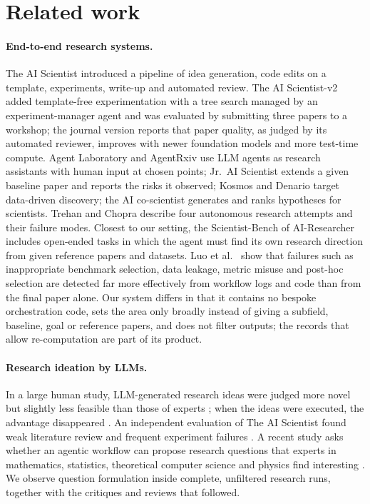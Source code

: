 \documentclass[11pt]{article}
\begin{document}
\section{Related work}
\label{sec:related}

\paragraph{End-to-end research systems.}
The AI Scientist \citep{lu2024aiscientist} introduced a pipeline of idea generation, code edits on a template, experiments, write-up and automated review. The AI Scientist-v2 \citep{yamada2025aiscientistv2} added template-free experimentation with a tree search managed by an experiment-manager agent and was evaluated by submitting three papers to a workshop; the journal version \citep{lu2026nature} reports that paper quality, as judged by its automated reviewer, improves with newer foundation models and more test-time compute. Agent Laboratory \citep{schmidgall2025agentlab} and AgentRxiv \citep{schmidgall2025agentrxiv} use LLM agents as research assistants with human input at chosen points; Jr.\ AI Scientist \citep{miyai2025jraiscientist} extends a given baseline paper and reports the risks it observed; Kosmos \citep{mitchener2025kosmos} and Denario \citep{villaescusa2025denario} target data-driven discovery; the AI co-scientist \citep{gottweis2025coscientist} generates and ranks hypotheses for scientists. Trehan and Chopra \citep{trehan2026whyllms} describe four autonomous research attempts and their failure modes. Closest to our setting, the Scientist-Bench of AI-Researcher \citep{tang2025airesearcher} includes open-ended tasks in which the agent must find its own research direction from given reference papers and datasets. Luo et al.\ \citep{luo2025pitfalls} show that failures such as inappropriate benchmark selection, data leakage, metric misuse and post-hoc selection are detected far more effectively from workflow logs and code than from the final paper alone. Our system differs in that it contains no bespoke orchestration code, sets the area only broadly instead of giving a subfield, baseline, goal or reference papers, and does not filter outputs; the records that allow re-computation are part of its product.

\paragraph{Research ideation by LLMs.}
In a large human study, LLM-generated research ideas were judged more novel but slightly less feasible than those of experts \citep{si2024ideas}; when the ideas were executed, the advantage disappeared \citep{si2025ideationgap}. An independent evaluation of The AI Scientist found weak literature review and frequent experiment failures \citep{beel2025evaluating}. A recent study asks whether an agentic workflow can propose research questions that experts in mathematics, statistics, theoretical computer science and physics find interesting \citep{nie2026after42}. We observe question formulation inside complete, unfiltered research runs, together with the critiques and reviews that followed.
\end{document}
